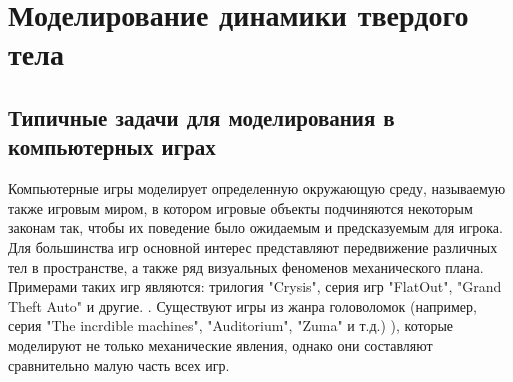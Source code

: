 \chapter{Моделирование динамики твердого тела}
\section{Типичные задачи для моделирования в компьютерных играх}

Компьютерные игры моделирует определенную окружающую среду,
называемую также игровым миром, в котором игровые объекты подчиняются
некоторым законам так, чтобы их поведение было ожидаемым и предсказуемым
для игрока. Для большинства игр основной интерес представляют передвижение
различных тел в пространстве, а также ряд визуальных феноменов механического
плана. Примерами таких игр являются: трилогия "Crysis", серия игр "FlatOut", "Grand Theft Auto" и другие.
. Существуют игры из жанра головоломок (например, серия "The incrdible machines", "Auditorium", "Zuma" и т.д.)
), которые моделируют не только механические явления, однако они составляют
сравнительно малую часть всех игр.



